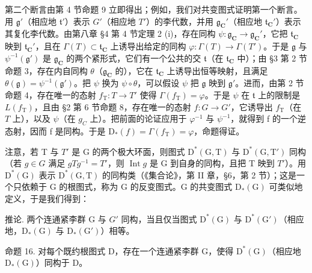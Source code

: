 第二个断言由第 4 节命题 9 立即得出；例如，我们对共变图式证明第一个断言。用 \(\mathfrak{g}'\)（相应地 \(\mathfrak{t}'\)）表示 \(G'\)（相应地 \(T'\)）的李代数，并用 \(\mathfrak{g}_{\mathbf{C}}'\)（相应地 \(\mathfrak{t}_{\mathbf{C}}'\)）表示其复化李代数。由第八章 §4 第 4 节定理 2 (i)，存在同构 \(\psi : \mathfrak{g}_{\mathbf{C}} \to \mathfrak{g}_{\mathbf{C}}'\)，它把 \(\mathfrak{t}_{\mathbf{C}}\) 映到 \(\mathfrak{t}_{\mathbf{C}}'\)，且在 \(\Gamma(T) \subset \mathfrak{t}_{\mathbf{C}}\) 上诱导出给定的同构 \(\varphi : \Gamma(T) \to \Gamma(T')\)。于是 \(\mathfrak{g}\) 与 \(\psi^{-1}(\mathfrak{g}')\) 是 \(\mathfrak{g}_{\mathbf{C}}\) 的两个紧形式，它们有一个公共的交 \(\mathfrak{t}\)（在 \(\mathfrak{t}_{\mathbf{C}}\) 中）；由 §3 第 2 节命题 3，存在内自同构 \(\theta\)（\(\mathfrak{g}_{\mathbf{C}}\) 的），它在 \(\mathfrak{t}_{\mathbf{C}}\) 上诱导出恒等映射，且满足 \(\theta(\mathfrak{g}) = \psi^{-1}(\mathfrak{g}')\)。把 \(\psi\) 换为 \(\psi \circ \theta\)，可以假设 \(\psi\) 把 \(\mathfrak{g}\) 映到 \(\mathfrak{g}'\)。进而，由第 2 节命题 4，存在唯一的态射 \(f_{\mathrm{T}} : T \to T'\) 使得 \(\Gamma(f_{\mathrm{T}}) = \varphi\)。于是 \(\psi\) 在 \(\mathfrak{t}\) 上的限制是 \(L(f_{\mathrm{T}})\)，且由 §2 第 6 节命题 8，存在唯一的态射 \(f : G \to G'\)，它诱导出 \(f_{\mathrm{T}}\)（在 \(T\) 上），以及 \(\psi\)（在 \(g_{C}\) 上）。把前面的论证应用于 \(\varphi^{-1}\) 与 \(\psi^{-1}\)，就得到 f 的一个逆态射，因而 f 是同构。于是 \(\mathrm{D}_{*}(f)=\Gamma(f_{\mathrm{T}})=\varphi\)，命题得证。

注意，若 T 与 \(T'\) 是 G 的两个极大环面，则图式 \(\mathrm{D}^{*}(\mathrm{G},\mathrm{T})\) 与 \(\mathrm{D}^{*}(\mathrm{G},\mathrm{T}')\) 同构（若 \(g \in G\) 满足 \(gTg^{-1} = T'\)，则 \(\operatorname{Int} g\) 是 G 到自身的同构，且把 T 映到 \(T'\)）。用 \(\mathrm{D}^{*}(\mathrm{G})\) 表示 \(\mathrm{D}^{*}(\mathrm{G},\mathrm{T})\) 的同构类（《集合论》，第 II 章，§6，第 2 节）；这是一个只依赖于 G 的根图式，称为 G 的反变图式。G 的共变图式 \(\mathrm{D}_{*}(\mathrm{G})\) 可类似地定义，于是我们得到：

推论. 两个连通紧李群 G 与 \(G'\) 同构，当且仅当图式 \(\mathrm{D}^{*}(\mathrm{G})\) 与 \(\mathrm{D}^{*}(\mathrm{G}')\)（相应地，\(\mathrm{D}_{*}(\mathrm{G})\) 与 \(\mathrm{D}_{*}(\mathrm{G}')\)）相等。

命题 16. 对每个既约根图式 D，存在一个连通紧李群 G，使得 \(\mathrm{D}^{*}(\mathrm{G})\)（相应地 \(\mathrm{D}_{*}(\mathrm{G})\)）同构于 D。

